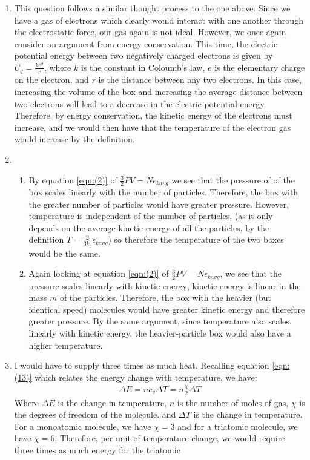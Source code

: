 \begin{enumerate}
    \item This question follows a similar thought process to the one above. Since we have a gas of electrons which clearly would interact with one another through the electrostatic force, our gas again is not ideal. However, we once again consider an argument from energy conservation. This time, the electric potential energy between two negatively charged electrons is given by $U_{q} = \frac{ke^2}{r}$, where $k$ is the constant in Coloumb's law, $e$ is the elementary charge on the electron, and $r$ is the distance between any two electrons. In this case, increasing the volume of the box and increasing the average distance between two electrons will lead to a decrease in the electric potential energy. Therefore, by energy conservation, the kinetic energy of the electrons must increase, and we would then have that the temperature of the electron gas would increase by the definition.
    \item \begin{enumerate}
        \item By equation \ref{eqn:(2)} of $\frac{3}{2}PV = N\epsilon_{kavg}$ we see that the pressure of of the box scales linearly with the number of particles. Therefore, the box with the greater number of particles would have greater pressure. However, temperature is independent of the number of particles, (as it only depends on the average kinetic energy of all the particles, by the definition $T=\frac{2}{3 k_{b}} \epsilon_{kavg}$) so therefore the temperature of the two boxes would be the same.  
        \item Again looking at equation \ref{eqn:(2)} of $\frac{3}{2}PV = N\epsilon_{kavg}$, we see that the pressure scales linearly with kinetic energy; kinetic energy is linear in the mass $m$ of the particles. Therefore, the
        box with the heavier (but identical speed) molecules would have greater kinetic energy and therefore greater pressure. By the same argument, since temperature also scales linearly with kinetic energy, the heavier-particle box would also have a higher temperature.
    \end{enumerate}
    \item I would have to supply three times as much heat. Recalling equation \ref{eqn:(13)} which relates the energy change with temperature, we have:
    \begin{align*}
        \Delta E = nc_v\Delta T = n\frac{\chi}{2}\Delta T
    \end{align*}
    Where $\Delta E$ is the change in temperature, $n$ is the number of moles of gas, $\chi$ is the degrees of freedom of the molecule. and $\Delta T$ is the change in temperature. For a monoatomic molecule, we have $\chi = 3$ and for a triatomic molecule, we have $\chi=6$. Therefore, per unit of temperature change, we would require three times as much energy for the triatomic 

\end{enumerate}

